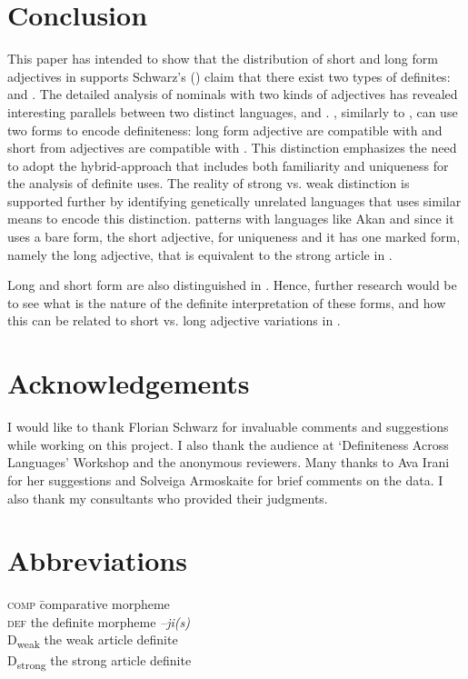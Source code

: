 \documentclass[output=paper,
modfonts
]{langscibook}
\begin{document}
\section{Conclusion} \label{sec:sereikaite:5}

This paper has intended to show that the distribution of short and long form adjectives in  supports Schwarz's (\citeyear{Schwarz2009,Schwarz2013}) claim that there exist two types of definites:  and . The detailed analysis of nominals with two kinds of adjectives has revealed interesting parallels between two distinct languages,  and . , similarly to , can use two forms to encode definiteness: long form adjective are compatible with  and short from adjectives are compatible with . This distinction emphasizes the need to adopt the hybrid-approach that includes both familiarity and uniqueness for the analysis of definite uses. The reality of strong vs. weak distinction is supported further by identifying genetically unrelated languages that uses similar means to encode this distinction.  patterns with languages like Akan and  since it uses a bare form, the short adjective, for uniqueness and it has one marked form, namely the long adjective, that is equivalent to the strong article in . 

Long and short form  are also distinguished in . Hence, further research would be to see what is the nature of the definite interpretation of these forms, and how this can be related to short vs. long adjective variations in .

\section*{Acknowledgements}
I would like to thank Florian Schwarz for invaluable comments  and suggestions while working on this project. I also thank the audience at `Definiteness Across Languages' Workshop and the anonymous reviewers. Many thanks to Ava Irani for her suggestions and Solveiga Armoskaite for brief comments on the data. I also thank my consultants who provided their judgments. 

\section*{Abbreviations}
\begin{tabbing}
	\textsc{comp}\hspace{1em} \= comparative morpheme\\ \kill 
	\textsc{def} \> the definite morpheme \textit{–ji(s)} \\
	D\textsubscript{weak} \> the weak article definite\\
	D\textsubscript{strong} \> the strong article definite \\
\end{tabbing}

{\sloppy
\printbibliography[heading=subbibliography,notkeyword=this]}
\end{document}
